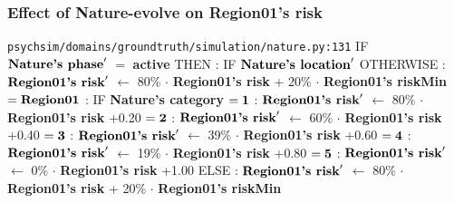 \documentclass{article}%
\begin{document}
%
\subsubsection{Effect of Nature{-}evolve on Region01's risk}%
\label{ssubsec:Effect of Nature{-}evolve on Region01's risk}%
\begin{flushleft}%
\verb|psychsim/domains/groundtruth/simulation/nature.py:131|%
\linebreak%
IF %
$\mbox{\textbf{Nature's phase}} '$%
$=$%
\textbf{active}%
\linebreak%
\hspace*{2em}%
THEN %
: %
IF %
$\mbox{\textbf{Nature's location}} '$%
\linebreak%
\hspace*{4em}%
OTHERWISE %
: %
$\mbox{\textbf{Region01's risk}} '$%
$\leftarrow$%
80\%%
$\cdot$%
\textbf{Region01's risk}%
+%
20\%%
$\cdot$%
\textbf{Region01's riskMin}%
\linebreak%
\hspace*{4em}%
$= \mbox{\textbf{Region01}}$%
: %
IF %
\textbf{Nature's category}%
\linebreak%
\hspace*{6em}%
$= \mbox{\textbf{1}}$%
: %
$\mbox{\textbf{Region01's risk}} '$%
$\leftarrow$%
80\%%
$\cdot$%
\textbf{Region01's risk}%
+0.20%
\linebreak%
\hspace*{6em}%
$= \mbox{\textbf{2}}$%
: %
$\mbox{\textbf{Region01's risk}} '$%
$\leftarrow$%
60\%%
$\cdot$%
\textbf{Region01's risk}%
+0.40%
\linebreak%
\hspace*{6em}%
$= \mbox{\textbf{3}}$%
: %
$\mbox{\textbf{Region01's risk}} '$%
$\leftarrow$%
39\%%
$\cdot$%
\textbf{Region01's risk}%
+0.60%
\linebreak%
\hspace*{6em}%
$= \mbox{\textbf{4}}$%
: %
$\mbox{\textbf{Region01's risk}} '$%
$\leftarrow$%
19\%%
$\cdot$%
\textbf{Region01's risk}%
+0.80%
\linebreak%
\hspace*{6em}%
$= \mbox{\textbf{5}}$%
: %
$\mbox{\textbf{Region01's risk}} '$%
$\leftarrow$%
0\%%
$\cdot$%
\textbf{Region01's risk}%
+1.00%
\linebreak%
\hspace*{2em}%
ELSE %
: %
$\mbox{\textbf{Region01's risk}} '$%
$\leftarrow$%
80\%%
$\cdot$%
\textbf{Region01's risk}%
+%
20\%%
$\cdot$%
\textbf{Region01's riskMin}%
\end{flushleft}
\end{document}
